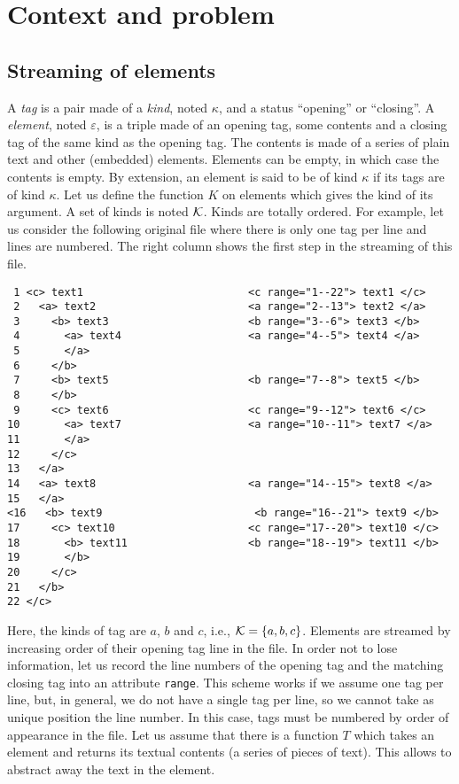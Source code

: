 
\section{Context and problem}
\label{problem} 

\subsection{Streaming of \XML elements} 

A \emph{tag} is a pair made of a \emph{kind}, noted \(\kappa\), and a
status ``opening'' or ``closing''. A \emph{element}, noted
\(\varepsilon\), is a triple made of an opening tag, some contents and
a closing tag of the same kind as the opening tag. The contents is
made of a series of plain text and other (embedded) elements. Elements
can be empty, in which case the contents is empty. By extension, an
element is said to be of kind \(\kappa\) if its tags are of kind
\(\kappa\). Let us define the function \(K\) on elements which gives
the kind of its argument. A set of kinds is noted \(\cal K\). Kinds
are totally ordered. For example, let us consider the following
original \XML file where there is only one tag per line and lines are
numbered. The right column shows the first step in the streaming of
this file.  
{\small\begin{verbatim}
 1 <c> text1                          <c range="1--22"> text1 </c>
 2   <a> text2                        <a range="2--13"> text2 </a>
 3     <b> text3                      <b range="3--6"> text3 </b>
 4       <a> text4                    <a range="4--5"> text4 </a>
 5       </a>              
 6     </b>
 7     <b> text5                      <b range="7--8"> text5 </b>
 8     </b>
 9     <c> text6                      <c range="9--12"> text6 </c>
10       <a> text7                    <a range="10--11"> text7 </a>
11       </a>
12     </c>
13   </a>
14   <a> text8                        <a range="14--15"> text8 </a>
15   </a>
<16   <b> text9                        <b range="16--21"> text9 </b>
17     <c> text10                     <c range="17--20"> text10 </c>
18       <b> text11                   <b range="18--19"> text11 </b>
19       </b>
20     </c>
21   </b>
22 </c>
\end{verbatim}}
\noindent Here, the kinds of tag are \(a\), \(b\) and \(c\), i.e.,
 \({\cal K} = \{a, b, c\}\). Elements are streamed by increasing order
 of their opening tag line in the \XML file. In order not to lose
 information, let us record the line numbers of the opening tag and
 the matching closing tag into an attribute \texttt{range}. This
 scheme works if we assume one tag per line, but, in general, we do
 not have a single tag per line, so we cannot take as unique position
 the line number. In this case, tags must be numbered by order of
 appearance in the file. Let us assume that there is a function \(T\)
 which takes an element and returns its textual contents (a series of
 pieces of text). This allows to abstract away the text in the
 element.

